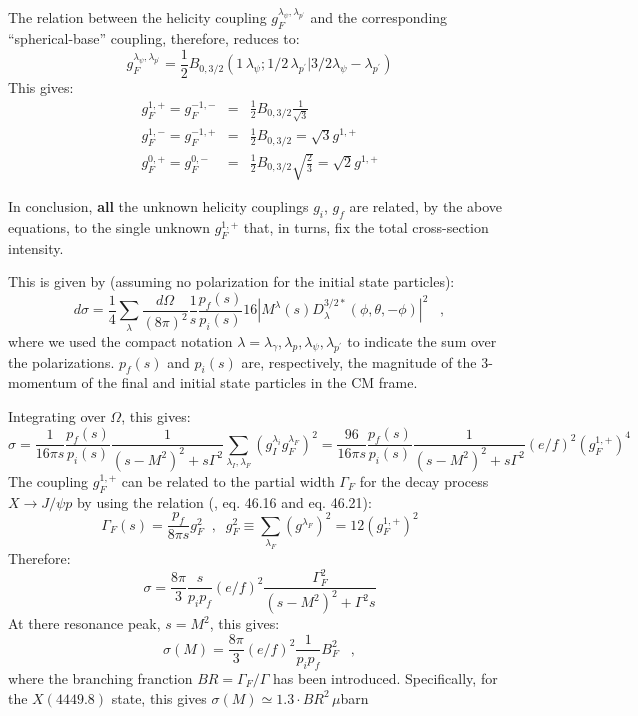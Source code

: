 \documentclass[a4paper,10pt]{article}
\begin{document}
\begin{itemize}
{The relation between the helicity coupling $g^{\lambda_\psi,\lambda_{p^{\prime}}}_{F}$ and the corresponding ``spherical-base'' coupling, therefore, reduces to:
\begin{equation}
g^{\lambda_\psi,\lambda_{p^{\prime}}}_{F} =\frac{1}{2} B_{0,3/2} (1 \, \lambda_\psi ; 1/2 \,  \lambda_{p^\prime} | 3/2 \lambda_\psi - \lambda_{p^{\prime}})
\end{equation}
}
This gives:
\begin{eqnarray}
g^{1,+}_{F}=g^{-1,-}_F&=&\frac{1}{2}B_{0,3/2}\frac{1}{\sqrt{3}}\\
g^{1,-}_{F}=g^{-1,+}_F&=&\frac{1}{2}B_{0,3/2} = \sqrt{3}g^{1,+}\\
g^{0,+}_F=g^{0,-}_F&=&\frac{1}{2}B_{0,3/2}\sqrt{\frac{2}{3}}=\sqrt{2}g^{1,+}
\end{eqnarray}
\end{itemize}

In conclusion, \textbf{all} the unknown helicity couplings $g_i$, $g_f$ are related, by the above equations, to the single unknown $g^{1,+}_{F}$ that, in turns, fix the total cross-section intensity.
 
This is given by (assuming no polarization for the initial state particles):
\begin{equation}
d\sigma = \frac{1}{4} \sum_{\lambda} \frac{d\Omega}{(8\pi)^2}\frac{1}{s}\frac{p_f(s)}{p_i(s)} 16 |M^\lambda(s)D^{3/2*}_{\lambda}(\phi,\theta,-\phi)|^2  \; \; \; ,
\end{equation}
where we used the compact notation $\lambda={\lambda_\gamma,\lambda_p,\lambda_\psi,\lambda_{p^\prime}}$ to indicate the sum over the polarizations. $p_f(s)$ and $p_i(s)$ are, respectively, the magnitude of the 3-momentum of the final and initial state particles in the CM frame.

Integrating over $\Omega$, this gives:
\begin{equation}
\sigma = \frac{1}{16\pi s}\frac{p_f(s)}{p_i(s)}\frac{1}{(s-M^2)^2+s\Gamma^2}\sum_{\lambda_I,\lambda_F}(g_I^{\lambda_i}g_F^{\lambda_F})^2 = 
\frac{96}{16\pi s}\frac{p_f(s)}{p_i(s)}\frac{1}{(s-M^2)^2+s\Gamma^2} (e/f)^2 (g_F^{1,+})^4
\end{equation}
The coupling $g_F^{1,+}$ can be related to the partial width $\Gamma_F$ for the decay process $X \rightarrow J/\psi p$ by using the relation (\cite{Agashe:2014kda}, eq. 46.16 and eq. 46.21):
\begin{equation}
\Gamma_F(s)=\frac{p_f}{8 \pi s}g^2_F \; \; , \; \; g^2_F \equiv \sum_{\lambda_F}(g^{\lambda_F})^2 = 12 (g^{1,+}_F)^2
\end{equation}
Therefore:
\begin{equation}
\sigma = \frac{8\pi}{3} \frac{s}{p_i p_f}(e/f)^2\frac{\Gamma^2_F}{(s-M^2)^2+\Gamma^2 s} 
\end{equation}
At there resonance peak, $s=M^2$, this gives:
\begin{equation}
\sigma(M) = \frac{8\pi}{3}(e/f)^2\frac{1}{p_ip_f} B^2_F \; \; \; ,
\end{equation}
where the branching franction $BR=\Gamma_F / \Gamma$ has been introduced. Specifically, for the $X(4449.8)$ state, this gives $\sigma(M)\simeq 1.3 \cdot BR^2 \, \mu$barn
\end{document}
